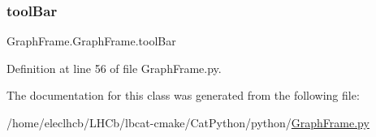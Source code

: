\subsubsection{\texorpdfstring{tool\+Bar}{toolBar}}
{\footnotesize\ttfamily Graph\+Frame.\+Graph\+Frame.\+tool\+Bar}



Definition at line 56 of file Graph\+Frame.\+py.



The documentation for this class was generated from the following file\+:\begin{DoxyCompactItemize}
\item 
/home/eleclhcb/\+L\+H\+Cb/lbcat-\/cmake/\+Cat\+Python/python/\hyperlink{GraphFrame_8py}{Graph\+Frame.\+py}\end{DoxyCompactItemize}
